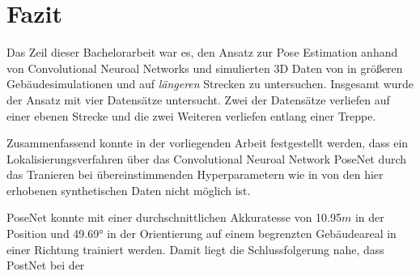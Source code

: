 
\section{Fazit}
\label{sec:kapitel_6}
Das Zeil dieser Bachelorarbeit war es, den Ansatz zur Pose Estimation anhand von Convolutional Neuroal Networks und simulierten 3D Daten von \citet{acharyaBIMPoseNetIndoorCamera2019} in größeren Gebäudesimulationen und auf \textit{längeren} Strecken zu untersuchen.
Insgesamt wurde der Ansatz mit vier Datensätze untersucht. Zwei der Datensätze verliefen auf einer ebenen Strecke und die zwei Weiteren verliefen entlang einer Treppe.

Zusammenfassend konnte in der vorliegenden Arbeit festgestellt werden, dass ein Lokalisierungsverfahren über das Convolutional Neuroal Network PoseNet durch das Tranieren bei übereinstimmenden Hyperparametern wie in \cite{acharyaBIMPoseNetIndoorCamera2019} von den hier erhobenen synthetischen Daten nicht möglich ist. 

PoseNet konnte mit einer durchschnittlichen Akkuratesse von 10.95$m$ in der Position und 49.69° in der Orientierung auf einem begrenzten Gebäudeareal in einer Richtung trainiert werden. Damit liegt die Schlussfolgerung nahe, dass PostNet bei der 

